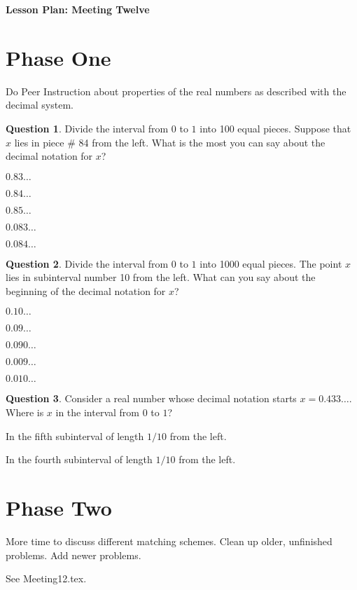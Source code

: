 \documentclass[12pt]{amsart}
\theoremstyle{definition}
\newtheorem{question}{Question}
\begin{document}
\begin{center}
\textbf{\Huge
Lesson Plan: Meeting Twelve
}
\end{center}
\vspace{.5in}

\section*{Phase One}
Do Peer Instruction about properties of the real numbers as described with the decimal system.

\begin{question}
Divide the interval from $0$ to $1$ into 100 equal pieces. Suppose that $x$ lies in piece \# 84 from the left. What is the most you can say about the decimal notation for $x$?
\begin{compactitem}
\item $0.83\ldots$
\item $0.84\ldots$
\item $0.85\ldots$
\item $0.083\ldots$
\item $0.084\ldots$
\end{compactitem}
\end{question}

\begin{question}
Divide the interval from $0$ to $1$ into 1000 equal pieces. The point $x$ lies in subinterval number 10 from the left. What can you say about the beginning of the decimal notation for $x$?
\begin{compactitem}
\item $0.10\ldots$
\item $0.09\ldots$
\item $0.090\ldots$
\item $0.009\ldots$
\item $0.010\ldots$
\end{compactitem}
\end{question}

\begin{question}
Consider a real number whose decimal notation starts $x = 0.433\ldots$. Where is $x$ in the interval from $0$ to $1$?
\begin{compactitem}
\item In the fifth subinterval of length $1/10$ from the left.
\item In the fourth subinterval of length $1/10$ from the left.
\end{compactitem}
\end{question}

\section*{Phase Two}

More time to discuss different matching schemes.
Clean up older, unfinished problems.
Add newer problems.

See Meeting12.tex.
\end{document}
